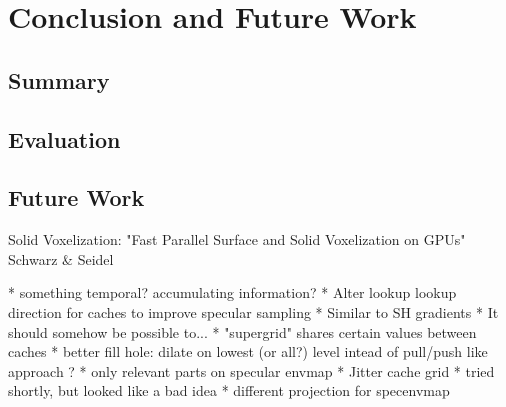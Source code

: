 \documentclass[thesis.tex]{subfiles}
\begin{document}
\chapter{Conclusion and Future Work}

\section{Summary}


\section{Evaluation}


\section{Future Work}

Solid Voxelization: "Fast Parallel Surface and Solid Voxelization on GPUs"  Schwarz \& Seidel 


* something temporal? accumulating information?
* Alter lookup lookup direction for caches to improve specular sampling
  * Similar to SH gradients
  * It should somehow be possible to...
* "supergrid" shares certain values between caches
* better fill hole: dilate on lowest (or all?) level intead of pull/push like approach ?
* only relevant parts on specular envmap
* Jitter cache grid
  * tried shortly, but looked like a bad idea
* different projection for specenvmap

\subfilebib %
\end{document}
